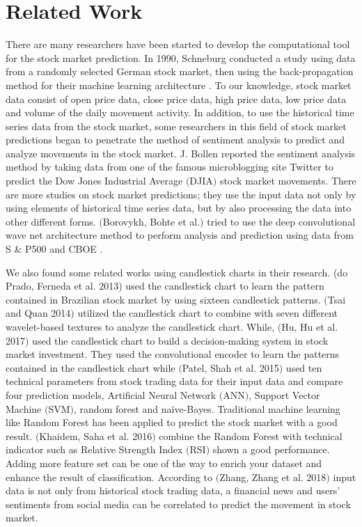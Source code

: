 \documentclass[12pt]{article}
\begin{document}
\section{Related Work}
There are many researchers have been started to develop the computational tool for the stock market prediction. In 1990, Schneburg conducted a study using data from a randomly selected German stock market, then using the back-propagation method for their machine learning architecture \cite{schoneburg1990stock}. To our knowledge, stock market data consist of open price data, close price data, high price data, low price data and volume of the daily movement activity. In addition, to use the historical time series data from the stock market, some researchers in this field of stock market predictions began to penetrate the method of sentiment analysis to predict and analyze movements in the stock market. J. Bollen reported the sentiment analysis method by taking data from one of the famous microblogging site Twitter to predict the Dow Jones Industrial Average $($DJIA$)$ stock market movements\cite{bollen2011twitter}. There are more studies on stock market predictions; they use the input data not only by using elements of historical time series data, but by also processing the data into other different forms. $($Borovykh, Bohte et al.$)$ tried to use the deep convolutional wave net architecture method to perform analysis and prediction using data from S \& P500 and CBOE \cite{borovykhdilated}.
\par
We also found some related works using candlestick charts in their research. (do Prado, Ferneda et al. 2013) used the candlestick chart to learn the pattern contained in Brazilian stock market by using sixteen candlestick patterns\cite{do2013effectiveness}. $($Tsai and Quan 2014$)$ utilized the candlestick chart to combine with seven different wavelet-based textures to analyze the candlestick chart\cite{tsai2014stock}. While,  $($Hu, Hu et al. 2017$)$ used the candlestick chart to build a decision-making system in stock market investment. They used the convolutional encoder to learn the patterns contained in the candlestick chart\cite{hu2017deep} while 
$($Patel, Shah et al. 2015$)$ used ten technical parameters from stock trading data for their input data and compare four prediction models, Artificial Neural Network $($ANN$)$, Support Vector Machine $($SVM$)$, random forest and naïve-Bayes\cite{patel2015predicting}. Traditional machine learning like Random Forest has been applied to predict the stock market with a good result. $($Khaidem, Saha et al. 2016$)$ combine the Random Forest with technical indicator such as Relative Strength Index $($RSI$)$ shown a good performance\cite{khaidem2016predicting}. Adding more feature set can be one of the way to enrich your dataset and enhance the result of classification. According to $($Zhang, Zhang et al. 2018$)$ input data is not only from historical stock trading data, a financial news and users’ sentiments from social media can be correlated to predict the movement in stock market\cite{zhang2018improving}.
\end{document}
